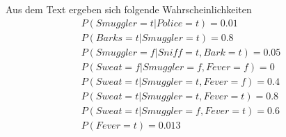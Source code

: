 \documentclass[a4paper,11pt,fleqn]{scrartcl}
\begin{document}
Aus dem Text ergeben sich folgende Wahrscheinlichkeiten
\begin{align*}
P(Smuggler= t \vert Police=t) = 0.01\\
 P(Barks= t \vert Smuggler=t) = 0.8\\
 P(Smuggler = f \vert Sniff = t, Bark = t)  = 0.05\\
 P(Sweat = f \vert Smuggler = f, Fever = f) = 0\\
 P(Sweat = t \vert Smuggler = t, Fever = f) = 0.4\\
 P(Sweat = t \vert Smuggler = t, Fever = t) = 0.8\\
 P(Sweat = t \vert Smuggler = f, Fever = t) = 0.6\\
 P(Fever = t) = 0.013\\
\end{align*}
\end{document}

